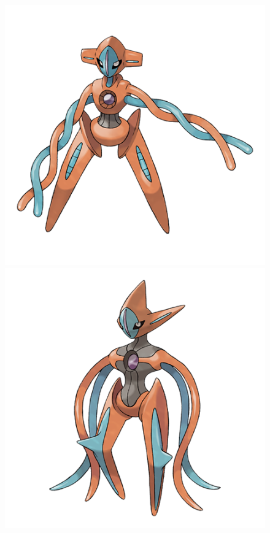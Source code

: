 \documentclass{article}
\begin{document}
\begin{figure}[H]
\begin{minipage}{.25\textwidth}
	\includegraphics[width=\textwidth]{386_f1.png}
\end{minipage}%
\begin{minipage}{.25\textwidth}
	\includegraphics[width=\textwidth]{386_f2.png}

\end{minipage}
\end{figure}
\end{document}
